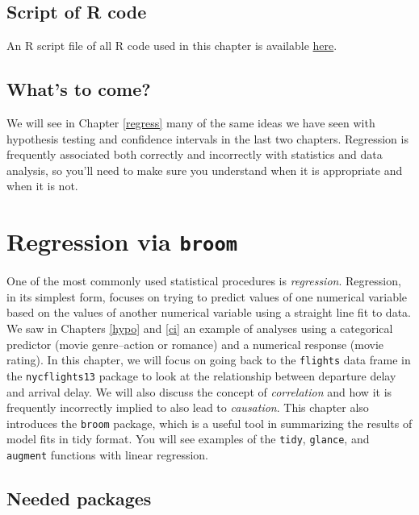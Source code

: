 \documentclass[]{tufte-book}
\begin{document}
\section{Script of R code}\label{script-of-r-code-3}

An R script file of all R code used in this chapter is available
\href{http://ismayc.github.io/moderndiver-book/08-ci.R}{here}.

\section{What's to come?}\label{whats-to-come-5}

We will see in Chapter \ref{regress} many of the same ideas we have seen
with hypothesis testing and confidence intervals in the last two
chapters. Regression is frequently associated both correctly and
incorrectly with statistics and data analysis, so you'll need to make
sure you understand when it is appropriate and when it is not.

\chapter{\texorpdfstring{Regression via
\texttt{broom}}{Regression via broom}}\label{regression-via-broom}

One of the most commonly used statistical procedures is
\emph{regression}. Regression, in its simplest form, focuses on trying
to predict values of one numerical variable based on the values of
another numerical variable using a straight line fit to data. We saw in
Chapters \ref{hypo} and \ref{ci} an example of analyses using a
categorical predictor (movie genre--action or romance) and a numerical
response (movie rating). In this chapter, we will focus on going back to
the \texttt{flights} data frame in the \texttt{nycflights13} package to
look at the relationship between departure delay and arrival delay. We
will also discuss the concept of \emph{correlation} and how it is
frequently incorrectly implied to also lead to \emph{causation}. This
chapter also introduces the \texttt{broom} package, which is a useful
tool in summarizing the results of model fits in tidy format. You will
see examples of the \texttt{tidy}, \texttt{glance}, and \texttt{augment}
functions with linear regression.

\section*{Needed packages}\label{needed-packages-5}
\end{document}
